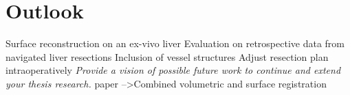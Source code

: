 %
%
%

\chapter{Outlook}
Surface reconstruction on an ex-vivo liver
Evaluation on retrospective data from navigated liver resections
Inclusion of vessel structures
Adjust resection plan intraoperatively
\textit{Provide a vision of possible future work to continue and extend your thesis research.}
\cite{postelnicu2009combined} paper -->Combined volumetric and surface registration

\endinput
